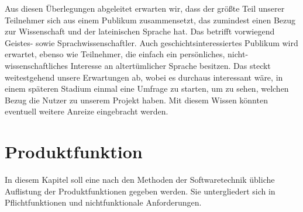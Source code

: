 \documentclass{article}
\begin{document}
Aus diesen Überlegungen abgeleitet erwarten wir, dass der größte Teil unserer Teilnehmer sich aus einem Publikum zusammensetzt,
das zumindest einen Bezug zur Wissenschaft und der lateinischen Sprache hat.
Das betrifft vorwiegend Geistes- sowie Sprachwissenschaftler. Auch geschichtsinteressiertes Publikum wird erwartet,
ebenso wie Teilnehmer, die einfach ein persönliches, nicht-wissenschaftliches Interesse an altertümlicher Sprache besitzen.
Das steckt weitestgehend unsere Erwartungen ab, wobei es durchaus interessant wäre, in einem späteren Stadium einmal eine Umfrage zu starten, um zu sehen, welchen Bezug die Nutzer zu unserem Projekt haben. Mit diesem Wissen könnten eventuell weitere Anreize eingebracht werden.

\section{Produktfunktion}
In diesem Kapitel soll eine nach den Methoden der Softwaretechnik übliche Auflistung der Produktfunktionen gegeben werden. 
Sie untergliedert sich in Pflichtfunktionen und nichtfunktionale Anforderungen.
\end{document}
